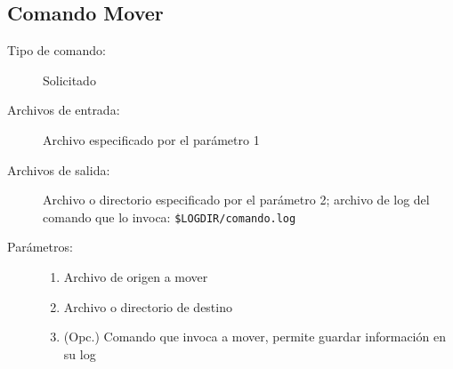 \documentclass[12pt]{article}
\begin{document}
\subsection{Comando Mover}
\begin{description}
	\item [Tipo de comando:] Solicitado
	
	\item [Archivos de entrada:] Archivo especificado por el parámetro 1
	
	\item [Archivos de salida:] Archivo o directorio especificado por el parámetro 2; archivo de log del comando que lo invoca: \verb|$LOGDIR/comando.log|
	
	\item [Parámetros:]
	\begin{enumerate}
		\item Archivo de origen a mover
		\item Archivo o directorio de destino
		\item (Opc.) Comando que invoca a mover, permite guardar información en su log
	\end{enumerate}
	

\end{description}
\end{document}
